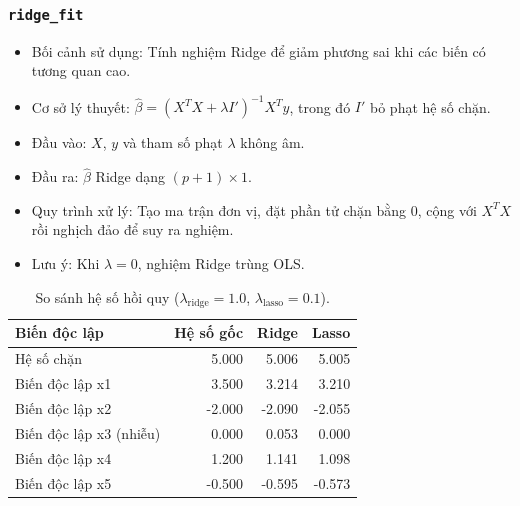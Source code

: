 \documentclass[a4paper]{article}
\newcommand{\code}[1]{\colorbox{light-gray}{\texttt{#1}}}
\begin{document}
\subsubsection{\code{ridge\_fit}}
\begin{itemize}[leftmargin=*]
    \item Bối cảnh sử dụng: Tính nghiệm Ridge để giảm phương sai khi các biến có tương quan cao.
    \item Cơ sở lý thuyết: $\hat{\beta}=(X^T X+\lambda I')^{-1}X^T y$, trong đó $I'$ bỏ phạt hệ số chặn.
    \item Đầu vào: $X$, $y$ và tham số phạt $\lambda$ không âm.
    \item Đầu ra: $\hat{\beta}$ Ridge dạng $(p+1)\times1$.
    \item Quy trình xử lý: Tạo ma trận đơn vị, đặt phần tử chặn bằng 0, cộng với $X^T X$ rồi nghịch đảo để suy ra nghiệm.
    \item Lưu ý: Khi $\lambda=0$, nghiệm Ridge trùng OLS.
\end{itemize}
\begin{table}[H]
    \centering
    \small
    \begin{tabular}{lrrr}
    \toprule
    \textbf{Biến độc lập} & \textbf{Hệ số gốc} & \textbf{Ridge} & \textbf{Lasso} \\
    \midrule
    Hệ số chặn & 5.000 & 5.006 & 5.005 \\
    Biến độc lập x1 & 3.500 & 3.214 & 3.210 \\
    Biến độc lập x2 & -2.000 & -2.090 & -2.055 \\
    Biến độc lập x3 (nhiễu) & 0.000 & 0.053 & 0.000 \\
    Biến độc lập x4 & 1.200 & 1.141 & 1.098 \\
    Biến độc lập x5 & -0.500 & -0.595 & -0.573 \\
    \bottomrule
    \end{tabular}
    \caption{So sánh hệ số hồi quy ($\lambda_{\text{ridge}}=1.0$, $\lambda_{\text{lasso}}=0.1$).}
\end{table}
\end{document}
